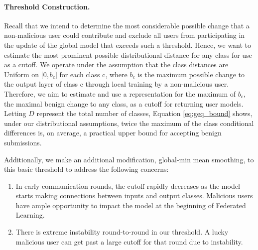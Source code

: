 \documentclass{article} %
\begin{document}
\paragraph{Threshold Construction.} Recall that we intend to determine the most considerable possible change that a non-malicious user could contribute and exclude all users from participating in the update of the global model that exceeds such a threshold. Hence, we want to estimate the most prominent possible distributional distance for any class for use as a cutoff. We operate under the assumption that the class distances are Uniform on $\mathopen[0, b_c\mathclose]$ for each class c, where $b_c$ is the maximum possible change to the output layer of class c through local training by a non-malicious user. Therefore, we aim to estimate and use a representation for the maximum of $b_c$, the maximal benign change to any class, as a cutoff for returning user models. Letting $D$ represent the total number of classes, Equation \ref{eq:geq_bound} shows, under our distributional assumptions, twice the maximum of the class conditional differences is, on average, a practical upper bound for accepting benign submissions.

Additionally, we make an additional modification, global-min mean smoothing, to this basic threshold to address the following concerns:
\begin{enumerate}
    \item In early communication rounds, the cutoff rapidly decreases as the model starts making connections between inputs and output classes. Malicious users have ample opportunity to impact the model at the beginning of Federated Learning.
    \item There is extreme instability round-to-round in our threshold. A lucky malicious user can get past a large cutoff for that round due to instability.
\end{enumerate}


%
\end{document}
